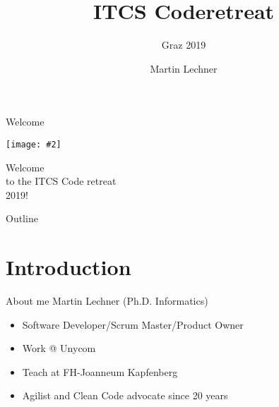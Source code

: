 \documentclass[12pt, xcolor=table, dvipsnames]{beamer}
\newcommand{\imagepos}[4]{
        \begin{textblock}{#1}(#2 , #3)
                \texttt{[image: \#4]}  
        \end{textblock}
}
\newcommand{\imageincl}[2]{
        \texttt{[image: \#2]}     
}
\begin{document}
\author[Lechner]{Martin Lechner} %
\title{ITCS Coderetreat }
\subtitle{Graz 2019}
%
\frame[plain]{\maketitle}

\begin{frame}{Welcome}

\imageincl{0.3}{ITCS_LOGO_small.jpg}

\centering
\Huge Welcome \\to the ITCS Code retreat\\ 2019!


\end{frame}

\begin{frame}[squeeze]{Outline}
\small
\tableofcontents
\end{frame}






\section{Introduction}

\begin{frame}{About me}
Martin Lechner (Ph.D. Informatics)
\pause
	\begin{itemize}[<+->]
		\item Software Developer/Scrum Master/Product Owner
		\item Work @ Unycom
		\item Teach at FH-Joanneum Kapfenberg
		\item Agilist and Clean Code advocate since 20 years		
	\end{itemize}  
\end{frame}
\end{document}
